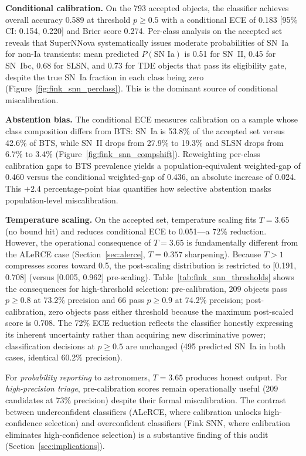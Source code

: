 \documentclass[twocolumn]{aastex631}
\begin{document}
\textbf{Conditional calibration.} On the 793 accepted objects, the classifier achieves overall accuracy 0.589 at threshold $p \ge 0.5$ with a conditional ECE of 0.183 [95\% CI: 0.154, 0.220] and Brier score 0.274. Per-class analysis on the accepted set reveals that SuperNNova systematically issues moderate probabilities of SN~Ia for non-Ia transients: mean predicted $P(\text{SN~Ia})$ is 0.51 for SN~II, 0.45 for SN~Ibc, 0.68 for SLSN, and 0.73 for TDE objects that pass its eligibility gate, despite the true SN~Ia fraction in each class being zero (Figure~\ref{fig:fink_snn_perclass}). This is the dominant source of conditional miscalibration.

\textbf{Abstention bias.} The conditional ECE measures calibration on a sample whose class composition differs from BTS: SN~Ia is 53.8\% of the accepted set versus 42.6\% of BTS, while SN~II drops from 27.9\% to 19.3\% and SLSN drops from 6.7\% to 3.4\% (Figure~\ref{fig:fink_snn_compshift}). Reweighting per-class calibration gaps to BTS prevalence yields a population-equivalent weighted-gap of 0.460 versus the conditional weighted-gap of 0.436, an absolute increase of 0.024. This $+2.4$ percentage-point bias quantifies how selective abstention masks population-level miscalibration.

\textbf{Temperature scaling.} On the accepted set, temperature scaling fits $T = 3.65$ (no bound hit) and reduces conditional ECE to 0.051---a 72\% reduction. However, the operational consequence of $T = 3.65$ is fundamentally different from the ALeRCE case (Section~\ref{sec:alerce}, $T = 0.357$ sharpening). Because $T > 1$ compresses scores toward 0.5, the post-scaling distribution is restricted to [0.191, 0.708] (versus [0.005, 0.962] pre-scaling). Table~\ref{tab:fink_snn_thresholds} shows the consequences for high-threshold selection: pre-calibration, 209 objects pass $p \ge 0.8$ at 73.2\% precision and 66 pass $p \ge 0.9$ at 74.2\% precision; post-calibration, zero objects pass either threshold because the maximum post-scaled score is 0.708. The 72\% ECE reduction reflects the classifier honestly expressing its inherent uncertainty rather than acquiring new discriminative power; classification decisions at $p \ge 0.5$ are unchanged (495 predicted SN~Ia in both cases, identical 60.2\% precision).

For \emph{probability reporting} to astronomers, $T = 3.65$ produces honest output. For \emph{high-precision triage}, pre-calibration scores remain operationally useful (209 candidates at 73\% precision) despite their formal miscalibration. The contrast between underconfident classifiers (ALeRCE, where calibration unlocks high-confidence selection) and overconfident classifiers (Fink SNN, where calibration eliminates high-confidence selection) is a substantive finding of this audit (Section~\ref{sec:implications}).
\end{document}
